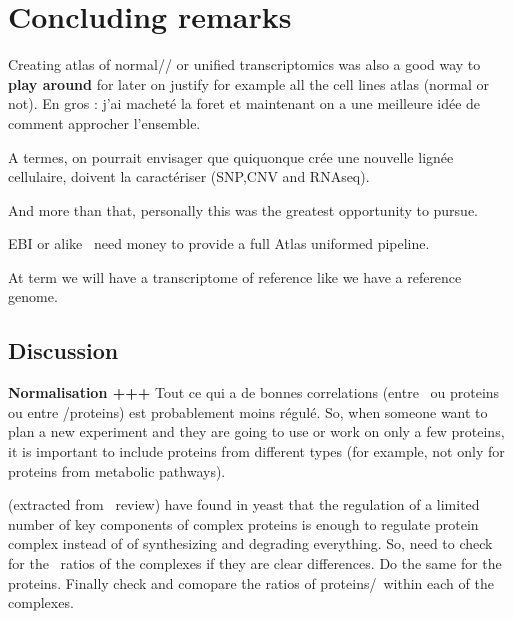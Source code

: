 \clearpage
\chapter{Concluding remarks}
\label{ch:conclusion}



Creating atlas of normal// or unified transcriptomics was also a good way to
\textbf{play around} for later on justify for example all the cell lines atlas
(normal or not). En gros : j'ai macheté la foret et maintenant on a une meilleure
idée de comment approcher  l'ensemble.

A termes, on pourrait envisager que quiquonque crée une nouvelle lignée cellulaire,
doivent la caractériser (SNP,CNV and RNAseq).


And more than that, personally this was the greatest opportunity to pursue.



EBI or alike \rightarrow\ need money to provide a full Atlas uniformed pipeline.

At term we will have a transcriptome of reference like we have a reference genome.





\section{Discussion}

\textbf{Normalisation +++}
Tout ce qui a de bonnes correlations
(entre \mRNAs\ ou proteins ou entre \mRNAs/proteins)
est probablement moins régulé.
So, when someone want to plan a new experiment
and they are going to use or work on only a few proteins,
it is important to include proteins from different types
(for example, not only for proteins from metabolic pathways).


\cite{De_Lichtenberg2005-ka}
(extracted from~\cite{Liu2016-re} review)
have found in yeast that
the regulation of a limited number of key components of
complex proteins is enough to regulate protein complex
instead of of synthesizing and degrading everything.
So, need to check for the \mRNAs\ ratios of the complexes
if they are clear differences. Do the same for the proteins.
Finally check and comopare the ratios of proteins/\mRNAs\ within each of the complexes.

















